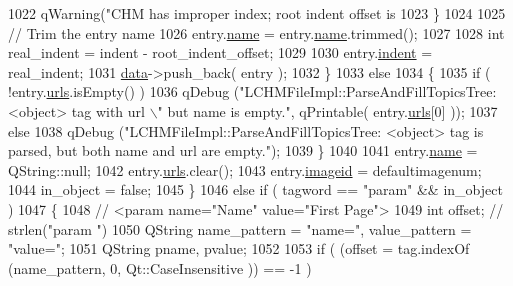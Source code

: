 \begin{DoxyCode}
{{1022                         qWarning(\textcolor{stringliteral}{"CHM has improper index; root indent offset is %
1023                 \}
1024                 
1025                 \textcolor{comment}{// Trim the entry name}
1026                 entry.\hyperlink{structLCHMParsedEntry_a90196da32bb2ed757f516caf583a6437}{name} = entry.\hyperlink{structLCHMParsedEntry_a90196da32bb2ed757f516caf583a6437}{name}.trimmed();
1027                 
1028                 \textcolor{keywordtype}{int} real\_indent = indent - root\_indent\_offset;
1029                 
1030                 entry.\hyperlink{structLCHMParsedEntry_a33a145dba3dd4761f26b361dcf49017b}{indent} = real\_indent;
1031                 \hyperlink{structdrawinf_af73f66288002f0a25c7843a534bf1340}{data}->push\_back( entry );
1032             \}
1033             \textcolor{keywordflow}{else}
1034             \{
1035                 \textcolor{keywordflow}{if} ( !entry.\hyperlink{structLCHMParsedEntry_aa871a08e7fca4ae8e23983ff299bd24f}{urls}.isEmpty() )
1036                     qDebug (\textcolor{stringliteral}{"LCHMFileImpl::ParseAndFillTopicsTree: <object> tag with url \(\backslash\)"%
       but name is empty."}, qPrintable( entry.\hyperlink{structLCHMParsedEntry_aa871a08e7fca4ae8e23983ff299bd24f}{urls}[0] ));
1037                 \textcolor{keywordflow}{else}
1038                     qDebug (\textcolor{stringliteral}{"LCHMFileImpl::ParseAndFillTopicsTree: <object> tag is parsed, but both name
       and url are empty."});  
1039             \}
1040 
1041             entry.\hyperlink{structLCHMParsedEntry_a90196da32bb2ed757f516caf583a6437}{name} = QString::null;
1042             entry.\hyperlink{structLCHMParsedEntry_aa871a08e7fca4ae8e23983ff299bd24f}{urls}.clear();
1043             entry.\hyperlink{structLCHMParsedEntry_aefeb9372238ddebc327350e1696ec901}{imageid} = defaultimagenum;
1044             in\_object = \textcolor{keyword}{false};
1045         \}
1046         \textcolor{keywordflow}{else} \textcolor{keywordflow}{if} ( tagword == \textcolor{stringliteral}{"param"} && in\_object )
1047         \{
1048             \textcolor{comment}{// <param name="Name" value="First Page">}
1049             \textcolor{keywordtype}{int} offset; \textcolor{comment}{// strlen("param ")}
1050             QString name\_pattern = \textcolor{stringliteral}{"name="}, value\_pattern = \textcolor{stringliteral}{"value="};
1051             QString pname, pvalue;
1052 
1053             \textcolor{keywordflow}{if} ( (offset = tag.indexOf (name\_pattern, 0, Qt::CaseInsensitive )) == -1 )
}}}
\end{DoxyCode}
